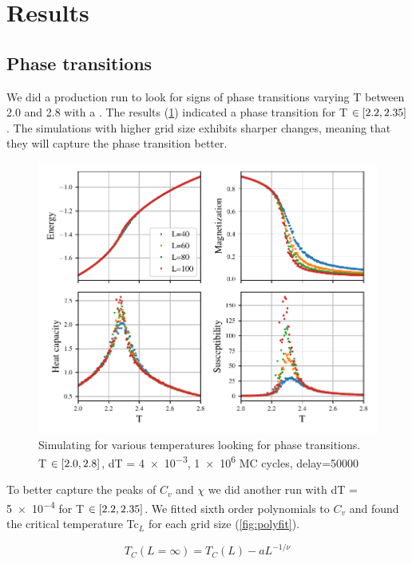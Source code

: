 \section{Results}

\subsection{Phase transitions}

We did a production run to look for signs of phase transitions varying T between
2.0 and 2.8 with a .
The results (\cref{fig:phase}) indicated a phase transition for T $\in
\left[2.2,2.35\right]$. The simulations with higher grid size exhibits sharper
changes, meaning that they will capture the phase transition better.

\begin{figure}[H]
  \centering
  \includegraphics[width=\textwidth]{../figures/phase.pdf}
  \caption{Simulating for various temperatures looking for phase transitions.\\
  T $\in \left[2.0,2.8\right]$, dT = \num{4e-3}, \num{1e6} MC cycles, delay=50000}
  \label{fig:phase}
\end{figure}


To better capture the peaks of $C_v$ and $\chi$ we did another
run with dT = \num{5e-4} for T $\in \left[2.2, 2.35\right]$.
 We fitted sixth order polynomials to $C_v$ and found
the critical temperature Tc$_{L}$ for each grid size (\ref{fig:polyfit}).


\begin{equation}
  \label{eq:scaling}
  T_C(L=\infty) = T_C(L) - aL^{-1/\nu}
\end{equation}

